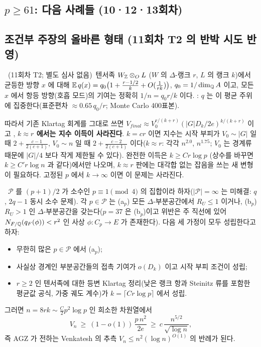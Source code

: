 \subsection{$p\ge61$: 다음 사례들 (10·12·13회차)}\label{sec:p61}


\subsection{조건부 주장의 올바른 형태 (11회차 T2 의 반박 시도 반영)}
\begin{proposition}[텐서족의 사영 분산]\tagP\ (11회차 T2; 별도 심사 없음)\
텐서족 $W_{\mathbb{Z}}\otimes_OL$ ($W$ 의 $\Delta$-랭크 $r$, $L$ 의 랭크 $k$)에서 균등한 방향 $x$ 에 대해 $\mathbb{E}\,q(x)=q_0\big(1+\tfrac{r-1/2}{k}+O(\tfrac1{rk})\big)$, $q_0=1/\dim_{\mathbb{Q}} A$ 이고, 모든 $x$ 에서 항등 방향(호흡 모드)의 기여는 정확히 $1/n=q_0r/k$ 이다. \tagN: $q$ 는 이 평균 주위에 집중한다(표준편차 $\approx0.65\,q_0/r$; Monte Carlo 400표본).
\end{proposition}
따라서 기존 Klartag 회계를 그대로 쓰면 $V_{final}\approx V_0^{r/(k+r)}(|G|D_k/2e)^{k/(k+r)}$ 이고 \tagH, \textbf{$k\approx r$ 에서는 지수 이득이 사라진다}. $k=cr$ 이면 지수는 시작 부피가 $V_0\sim|G|$ 일 때 $2+\tfrac{c-1}{2(c+1)}$, $V_0\sim n$ 일 때 $2+\tfrac{c-2}{2(c+1)}$ 이다($k\approx r$: 각각 $n^{2.0}$, $n^{1.75}$; $V_0$ 는 경계류 때문에 $|G|/4$ 보다 작게 제한될 수 있다). 완전한 이득은 $k\ge Cr\log p$ (상수를 바꾸면 $k\ge C'r\log n$ 과 같다)에서만 나오며, $k\approx r$ 판에는 대각합 없는 잡음을 쓰는 새 변형이 필요하다. 고정된 $p$ 에서 $k\to\infty$ 이면 이 문제는 사라진다.
\begin{proposition}[조건부 양자택일]\label{conj:dichotomy}\tagC\
$\mathcal P$ 를 $(p+1)/2$ 가 소수인 $p\equiv1\pmod4$ 의 집합이라 하자($|\mathcal P|=\infty$ 는 미해결: $q$, $2q-1$ 동시 소수 문제). 각 $p\in\mathcal P$ 는 (a$_p$) 모든 $\Delta$-부분공간에서 $R_U\le1$ 이거나, (b$_p$) $R_U>1$ 인 $\Delta$-부분공간을 갖는다($p=37$ 은 (b$_p$)이고 위반은 주 직선에 있어 $N_{F/\mathbb{Q}}(q_F(\phi))<r^2$ 인 사상 $\phi:C_p\to E$ 가 존재한다). 다음 세 가정이 모두 성립한다고 하자:
\begin{itemize}
\item[(H1)] 무한히 많은 $p\in\mathcal P$ 에서 (a$_p$);
\item[(H2)] 사실상 경계인 부분공간들의 접촉 기여가 $o(D_k)$ 이고 시작 부피 조건이 성립;
\item[(H3)] $r\ge2$ 인 텐서족에 대한 등변 Klartag 정리(낮은 랭크 항과 Steinitz 류를 포함한 평균값 공식, 가중 궤도 계수)가 $k=\lceil Cr\log p\rceil$ 에서 성립.
\end{itemize}
그러면 $n=8rk\sim\tfrac C2p^2\log p$ 인 희소한 차원열에서
\[
V_n\ \ge\ (1-o(1))\,\frac{p\,n^2}{2e}\ \ge\ c\,\frac{n^{5/2}}{\sqrt{\log n}},
\]
즉 AGZ 가 전하는 Venkatesh 의 추측 $V_n\le n^2(\log n)^{O(1)}$ 의 반례가 된다.
\end{proposition}
